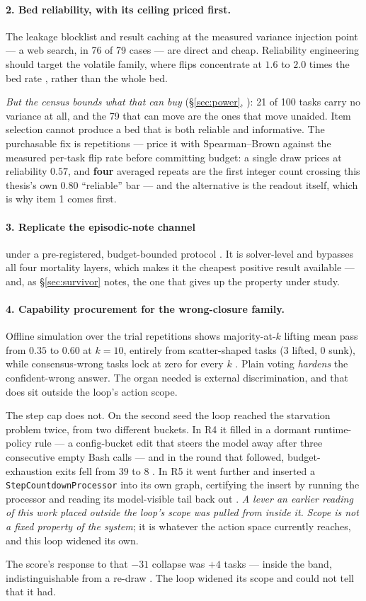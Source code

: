 \paragraph{2. Bed reliability, with its ceiling priced first.} The leakage
blocklist and result caching at the measured variance injection point ---
a web search, in 76 of 79 cases  --- are direct and cheap. Reliability
engineering should target the volatile family, where flips concentrate at
$1.6$ to $2.0$ times the bed rate , rather than the whole
bed.

\emph{But the census bounds what that can buy} (\S\ref{sec:power}, ):
21 of 100 tasks carry no variance at all, and the 79 that can move are the
ones that move unaided. Item selection cannot produce a bed that is both
reliable and informative. The purchasable fix is repetitions --- price it
with Spearman--Brown against the measured per-task flip rate before
committing budget: a single draw prices at reliability $0.57$, and
\textbf{four} averaged repeats are the first integer count crossing this
thesis's own $0.80$ ``reliable'' bar  --- and the alternative is the
readout itself, which is why item 1 comes first.

\paragraph{3. Replicate the episodic-note channel} under a pre-registered,
budget-bounded protocol . It is solver-level and bypasses all four
mortality layers, which makes it the cheapest positive result available ---
and, as \S\ref{sec:survivor} notes, the one that gives up the property
under study.

\paragraph{4. Capability procurement for the wrong-closure family.}
Offline simulation over the trial repetitions shows majority-at-$k$ lifting
mean pass from $0.35$ to $0.60$ at $k{=}10$, entirely from scatter-shaped
tasks (3 lifted, 0 sunk), while consensus-wrong tasks lock at zero for
every $k$ . Plain voting \emph{hardens} the confident-wrong answer.
The organ needed is external discrimination, and that does sit outside the
loop's action scope.

The step cap does not. On the second seed the loop reached the starvation
problem twice, from two different buckets. In R4 it filled in a dormant
runtime-policy rule --- a config-bucket edit that steers the model away
after three consecutive empty Bash calls --- and in the round that
followed, budget-exhaustion exits fell from $39$ to $8$ . In R5 it
went further and inserted a \texttt{StepCountdownProcessor} into its own
graph, certifying the insert by running the processor and reading its
model-visible tail back out . \emph{A lever an earlier reading of
this work placed outside the loop's scope was pulled from inside it.}
\emph{Scope is not a fixed property of the system}; it is whatever the
action space currently reaches, and this loop widened its own.

The score's response to that $-31$ collapse was $+4$ tasks --- inside the
band, indistinguishable from a re-draw . The loop widened its scope
and could not tell that it had.

